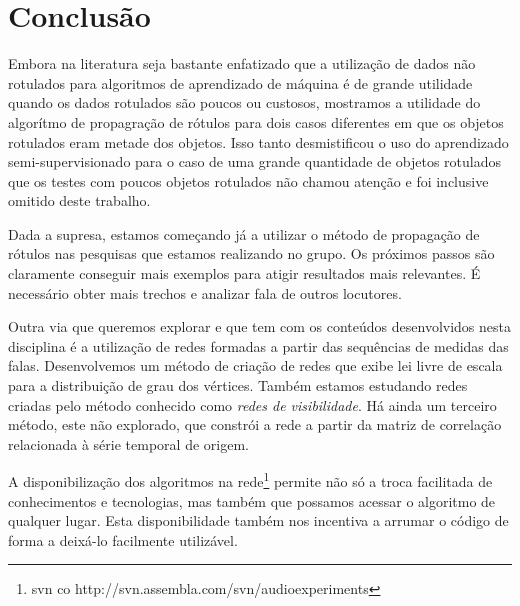 \documentclass[12pt]{article}
\begin{document}
\section{Conclusão}
Embora na literatura seja bastante enfatizado que a utilização de dados não rotulados para algoritmos de aprendizado de máquina é de grande utilidade quando os dados rotulados são poucos ou custosos, mostramos a utilidade do algorítmo de propagração de rótulos para dois casos diferentes em que os objetos rotulados eram metade dos objetos. Isso tanto desmistificou o uso do aprendizado semi-supervisionado para o caso de uma grande quantidade de objetos rotulados que os testes com poucos objetos rotulados não chamou atenção e foi inclusive omitido deste trabalho.

Dada a supresa, estamos começando já a utilizar o método de propagação de rótulos nas pesquisas que estamos realizando no grupo. Os próximos passos são claramente conseguir mais exemplos para atigir resultados mais relevantes. É necessário obter mais trechos e analizar fala de outros locutores.

Outra via que queremos explorar e que tem com os conteúdos desenvolvidos nesta disciplina é a utilização de redes formadas a partir das sequências de medidas das falas. Desenvolvemos um método de criação de redes que exibe lei livre de escala para a distribuição de grau dos vértices. Também estamos estudando redes criadas pelo método conhecido como \emph{redes de visibilidade}. Há ainda um terceiro método, este não explorado, que constrói a rede a partir da matriz de correlação relacionada à série temporal de origem.

A disponibilização dos algoritmos na rede\footnote{svn co http://svn.assembla.com/svn/audioexperiments} permite não só a troca facilitada de conhecimentos e tecnologias, mas também que possamos acessar o algoritmo de qualquer lugar. Esta disponibilidade também nos incentiva a arrumar o código de forma a deixá-lo facilmente utilizável.
\end{document}
